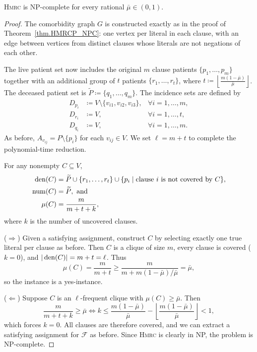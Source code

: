 \begin{theorem}\label{thm.HMRCP_NPC_fixmu}
    \textsc{Hmrc} is NP-complete for every rational $\bar \mu \in (0,1)$.
\end{theorem}
\begin{proof}
    The comorbidity graph $G$ is constructed exactly as in the proof of Theorem~\ref{thm.HMRCP_NPC}: one vertex per literal in each clause, with an edge between vertices from distinct clauses whose literals are not negations of each other.

    The live patient set now includes the original $m$ clause patients $\{p_1,\ldots,p_m\}$ together with an additional group of $t$ patients $\{r_1,\ldots,r_t\}$, where $t \coloneqq \left\lfloor\frac{m(1-\bar\mu)}{\bar\mu}\right\rfloor$. The deceased patient set is $\widetilde{P} \coloneqq \{q_1,\ldots,q_m\}$. The incidence sets are defined by
    \begin{align*}
        D_{p_i} &\coloneqq V \setminus \{v_{i1}, v_{i2}, v_{i3}\}, &\forall i=1,\ldots,m,\\
        D_{r_i} &\coloneqq V, &\forall i=1,\ldots,t,\\
        D_{q_i} &\coloneqq V, &\forall i=1,\ldots,m.
    \end{align*}
    As before, $A_{v_{ij}} = P \setminus \{p_i\}$ for each $v_{ij} \in V$. We set $\ell = m + t$ to complete the polynomial-time reduction.

    For any nonempty $C \subseteq V$,
    \begin{align*}
        \operatorname*{den}(C) &= \widetilde{P} \cup \{r_1,\ldots,r_t\} \cup \{p_i \mid \text{clause } i \text{ is not covered by } C\}, \\
        \operatorname*{num}(C) &= \widetilde{P}, \text{ and}\\
        \mu(C) &= \frac{m}{m+t+k},
    \end{align*}
    where $k$ is the number of uncovered clauses.

    ($\Rightarrow$) Given a satisfying assignment, construct $C$ by selecting exactly one true literal per clause as before. Then $C$ is a clique of size $m$, every clause is covered ($k=0$), and $|\operatorname*{den}(C)| = m+t = \ell$. Thus
    \[
        \mu(C) = \frac{m}{m+t} \ge \frac{m}{m + m(1-\bar\mu)/\bar\mu} = \bar\mu,
    \]
    so the instance is a yes-instance.

    ($\Leftarrow$) Suppose $C$ is an $\ell$-frequent clique with $\mu(C) \ge \bar\mu$. Then
    \[
        \frac{m}{m+t+k} \ge \bar\mu \iff k \le \frac{m(1-\bar\mu)}{\bar\mu} - \left\lfloor \frac{m(1-\bar\mu)}{\bar\mu} \right\rfloor < 1,
    \]
    which forces $k=0$. All clauses are therefore covered, and we can extract a satisfying assignment for $\mathcal{F}$ as before. Since \textsc{Hmrc} is clearly in NP, the problem is NP-complete.
\end{proof}


